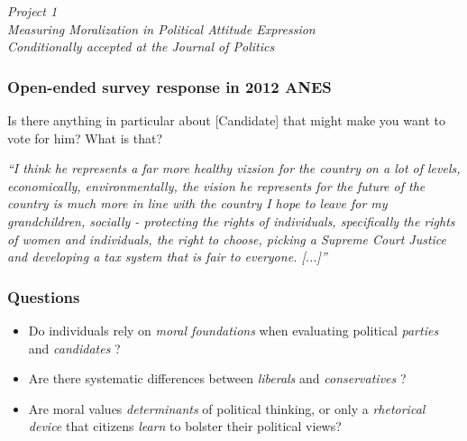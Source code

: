 \begin{frame}
\begin{center}
\emph{Project 1}\\\vspace{1em}
\emph{\Large{Measuring Moralization in Political Attitude Expression}}\\\vspace{1em}
\emph{Conditionally accepted at the \textit{Journal of Politics}}
\end{center}
\end{frame}


\begin{frame}
\frametitle{Open-ended survey response in 2012 ANES}
\begin{exampleblock}{Is there anything in particular about [Candidate] that might make you want to vote for him? What is that?}
  \begin{center}
    \textit{``I think he represents a far more healthy vizsion for the country on a lot of levels, economically, environmentally, the vision he represents for the future of the country is much more in line with the country I hope to leave for my grandchildren, socially - protecting the rights of individuals, specifically the rights of women and individuals, the right to choose, picking a Supreme Court Justice and developing a tax system that is fair to everyone. [...]''}
  \end{center}
\end{exampleblock}
\end{frame}


\begin{frame}%
  \frametitle{Questions}
  \begin{itemize}
    \item Do individuals rely on \emph{moral foundations} when evaluating political \emph{parties} and \emph{candidates} \citep{haidt2008moral}?
    \item Are there systematic differences between \emph{liberals} and \emph{conservatives} \citep{haidt2007morality,graham2009liberals}?
    \item Are moral values \emph{determinants} of political thinking, or only a \emph{rhetorical device} that citizens \emph{learn} to bolster their political views?
  \end{itemize}
\end{frame}


